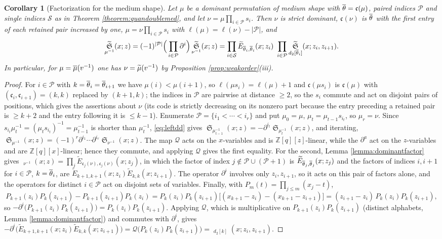 \documentclass{amsart}
\newtheorem{corollary}[lemma]{Corollary}
\theoremstyle{definition}
\theoremstyle{remark}
\numberwithin{equation}{section}
\DeclareMathOperator{\sch}{\mathfrak{S}}
\DeclareMathOperator{\qsch}{\widetilde{\mathfrak{S}}}
\newcommand{\code}{\mathfrak{c}}
\newcommand{\qelem}{\widetilde{E}}
\begin{document}
\begin{corollary}[Factorization for the medium shape] \label{corollary:mediumfactor}
Let $\mu$ be a dominant permutation of medium shape with $\medtheta=\code(\mu)$, paired indices $\mathcal P$ and single indices $\mathcal S$ as in Theorem \ref{theorem:quandoublemed}, and let $\nu=\mu\prod_{i\in\mathcal P}s_i$. Then $\nu$ is strict dominant, $\code(\nu)$ is $\overline{\theta}$ with the first entry of each retained pair increased by one, $\mu=\nu\prod_{i\in\mathcal P}s_i$ with $\ell(\mu)=\ell(\nu)-|\mathcal P|$, and
$$\qsch_{\mu^{-1}}(x;z)=(-1)^{|\mathcal P|}\Big(\prod_{i\in\mathcal P}\partial^{i}\Big)\qsch_{\nu^{-1}}(x;z)=\prod_{i\in\mathcal S}\qelem_{\medtheta_i,\medtheta_i}(x;z_i)\ \prod_{i\in\mathcal P}\qsch_{d_2[\medtheta_i]}(x;z_i,z_{i+1}).$$
In particular, for $\mu=\overline{\mu}(v^{-1})$ one has $\nu=\widetilde{\mu}(v^{-1})$ by Proposition \ref{prop:weakorder}(iii).
\end{corollary}
\begin{proof}
For $i\in\mathcal P$ with $k=\overline{\theta}_i=\overline{\theta}_{i+1}$ we have $\mu(i)<\mu(i+1)$, so $\ell(\mu s_i)=\ell(\mu)+1$ and $\code(\mu s_i)$ is $\code(\mu)$ with $(\code_i,\code_{i+1})=(k,k)$ replaced by $(k+1,k)$; the indices in $\mathcal P$ are pairwise at distance $\geq2$, so the $s_i$ commute and act on disjoint pairs of positions, which gives the assertions about $\nu$ (its code is strictly decreasing on its nonzero part because the entry preceding a retained pair is $\geq k+2$ and the entry following it is $\leq k-1$). Enumerate $\mathcal P=\{i_1<\cdots<i_r\}$ and put $\mu_0=\mu$, $\mu_t=\mu_{t-1}s_{i_t}$, so $\mu_r=\nu$. Since $s_{i_t}\mu_t^{-1}=(\mu_ts_{i_t})^{-1}=\mu_{t-1}^{-1}$ is shorter than $\mu_t^{-1}$, \eqref{eq:leftdd} gives $\sch_{\mu_{t-1}^{-1}}(x;z)=-\partial^{i_t}\sch_{\mu_t^{-1}}(x;z)$, and iterating, $\sch_{\mu^{-1}}(x;z)=(-1)^r\partial^{i_1}\cdots\partial^{i_r}\sch_{\nu^{-1}}(x;z)$. The map $\mathcal Q$ acts on the $x$-variables and is $\mathbb Z[q][z]$-linear, while the $\partial^a$ act on the $z$-variables and are $\mathbb Z[q][x]$-linear; hence they commute, and applying $\mathcal Q$ gives the first equality. For the second, Lemma \ref{lemma:dominantfactor} gives $\qsch_{\nu^{-1}}(x;z)=\prod_j\qelem_{\code_j(\nu),\code_j(\nu)}(x;z_j)$, in which the factor of index $j\notin\mathcal P\cup(\mathcal P+1)$ is $\qelem_{\medtheta_j,\medtheta_j}(x;z_j)$ and the factors of indices $i,i+1$ for $i\in\mathcal P$, $k=\overline{\theta}_i$, are $\qelem_{k+1,k+1}(x;z_i)\qelem_{k,k}(x;z_{i+1})$. The operator $\partial^i$ involves only $z_i,z_{i+1}$, so it acts on this pair of factors alone, and the operators for distinct $i\in\mathcal P$ act on disjoint sets of variables. Finally, with $P_m(t)=\prod_{j\leq m}(x_j-t)$,
$$P_{k+1}(z_i)P_k(z_{i+1})-P_{k+1}(z_{i+1})P_k(z_i)=P_k(z_i)P_k(z_{i+1})\big[(x_{k+1}-z_i)-(x_{k+1}-z_{i+1})\big]=(z_{i+1}-z_i)\,P_k(z_i)P_k(z_{i+1}),$$
so $-\partial^i\big(P_{k+1}(z_i)P_k(z_{i+1})\big)=P_k(z_i)P_k(z_{i+1})$. Applying $\mathcal Q$, which is multiplicative on $P_{k+1}(z_i)P_k(z_{i+1})$ (distinct alphabets, Lemma \ref{lemma:dominantfactor}) and commutes with $\partial^i$, gives $-\partial^i\big(\qelem_{k+1,k+1}(x;z_i)\qelem_{k,k}(x;z_{i+1})\big)=\mathcal Q\big(P_k(z_i)P_k(z_{i+1})\big)=\qsch_{d_2[k]}(x;z_i,z_{i+1})$.
\end{proof}
\end{document}
